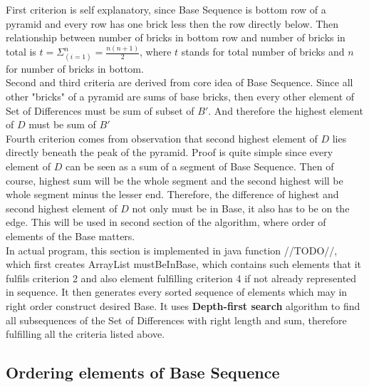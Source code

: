First criterion is self explanatory, since Base Sequence is bottom row of a pyramid and every row has one brick less then the row directly below. Then relationship between number of bricks in bottom row and number of bricks in total is $t = \Sigma_(i = 1)^n = \frac{n(n+1)}{2}$, where $t$ stands for total number of bricks and $n$ for number of bricks in bottom.
\\
Second and third criteria are derived from core idea of Base Sequence. Since all other "bricks" of a pyramid are sums of base bricks, then every other element of Set of Differences must be sum of subset of $B'$. And therefore the highest element of $D$ must be sum of $B'$
\\
Fourth criterion comes from observation that second highest element of $D$ lies directly beneath the peak of the pyramid. Proof is quite simple since every element of $D$ can be seen as a sum of a segment of Base Sequence. Then of course, highest sum will be the whole segment and the second highest will be whole segment minus the lesser end. Therefore, the difference of highest and second highest element of $D$ not only must be in Base, it also has to be on the edge. This will be used in second section of the algorithm, where order of elements of the Base matters.
\\
In actual program, this section is implemented in java function //TODO//, which first creates ArrayList mustBeInBase, which contains such elements that it fulfils criterion 2 and also element fulfilling criterion 4 if not already represented in sequence. It then generates every sorted sequence of elements which may in right order construct desired Base. It uses \textbf{Depth-first search} algorithm to find all subsequences of the Set of Differences with right length and sum, therefore fulfilling all the criteria listed above.


 

\subsection{Ordering elements of Base Sequence}
 
